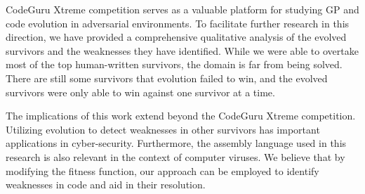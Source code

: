 \documentclass[dvipsnames, format=sigconf]{acmart}
\begin{document}
CodeGuru Xtreme competition serves as a valuable platform for studying GP and code evolution in adversarial environments. To facilitate further research in this direction, we have provided a comprehensive qualitative analysis of the evolved survivors and the weaknesses they have identified. While we were able to overtake most of the top human-written survivors, the domain is far from being solved. There are still some survivors that evolution failed to win, and the evolved survivors were only able to win against one survivor at a time.

The implications of this work extend beyond the CodeGuru Xtreme competition. Utilizing evolution to detect weaknesses in other survivors has important applications in cyber-security. Furthermore, the assembly language used in this research is also relevant in the context of computer viruses. We believe that by modifying the fitness function, our approach can be employed to identify weaknesses in code and aid in their resolution.

\newpage

  

\clearpage
\appendix
\end{document}
